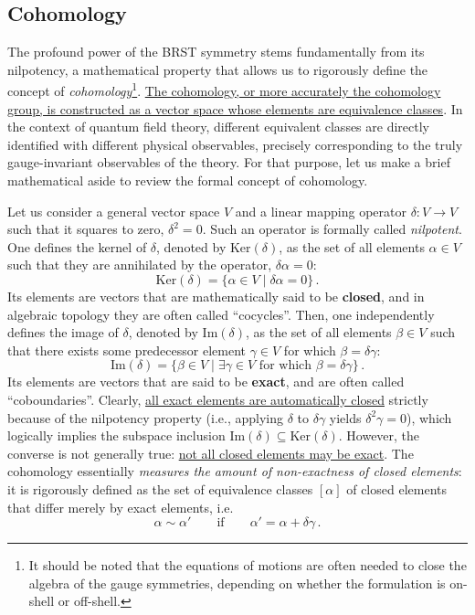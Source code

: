 \subsection{Cohomology}

The profound power of the BRST symmetry stems fundamentally from its nilpotency, a mathematical property that allows us to rigorously define the concept of \textit{cohomology}\footnote{It should be noted that the equations of motions are often needed to close the algebra of the gauge symmetries, depending on whether the formulation is on-shell or off-shell.}. \uline{The cohomology, or more accurately the cohomology group, is constructed as a vector space whose elements are equivalence classes}. In the context of quantum field theory, different equivalent classes are directly identified with different physical observables, precisely corresponding to the truly gauge-invariant observables of the theory. For that purpose, let us make a brief mathematical aside to review the formal concept of cohomology.

Let us consider a general vector space \(V\) and a linear mapping operator \(\delta : V \longrightarrow V\) such that it squares to zero, \(\delta^2 = 0\). Such an operator is formally called \textit{nilpotent}. One defines the kernel of \(\delta\), denoted by \(\mathrm{Ker}(\delta)\), as the set of all elements \(\alpha \in V\) such that they are annihilated by the operator, \(\delta\alpha = 0\):
\begin{equation} \label{eq:kernel_def}
    \mathrm{Ker}(\delta) = \{ \alpha \in V \mid \delta\alpha = 0 \} \, .
\end{equation}
Its elements are vectors that are mathematically said to be \textbf{closed}, and in algebraic topology they are often called ``cocycles''. Then, one independently defines the image of \(\delta\), denoted by \(\mathrm{Im}(\delta)\), as the set of all elements \(\beta \in V\) such that there exists some predecessor element \(\gamma \in V\) for which \(\beta = \delta\gamma\):
\begin{equation} \label{eq:image_def}
    \mathrm{Im}(\delta) = \{ \beta \in V \mid \exists \gamma \in V \text{ for which } \beta = \delta\gamma \} \, .
\end{equation}
Its elements are vectors that are said to be \textbf{exact}, and are often called ``coboundaries''. Clearly, \uline{all exact elements are automatically closed} strictly because of the nilpotency property (i.e., applying \(\delta\) to \(\delta\gamma\) yields \(\delta^2\gamma = 0\)), which logically implies the subspace inclusion \(\mathrm{Im}(\delta) \subseteq \mathrm{Ker}(\delta)\). However, the converse is not generally true: \uline{not all closed elements may be exact}. The cohomology essentially \textit{measures the amount of non-exactness of closed elements}: it is rigorously defined as the set of equivalence classes \([\alpha]\) of closed elements that differ merely by exact elements, i.e.
\begin{equation} \label{eq:cohomology_equivalence}
    \alpha \sim \alpha' \qquad \text{if} \qquad \alpha' = \alpha + \delta\gamma \, .
\end{equation}

